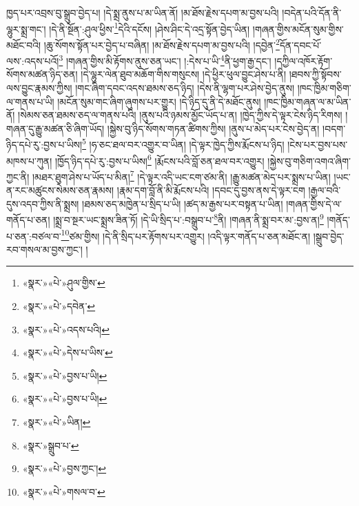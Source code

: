 ཁྱད་པར་འབྲས་བུ་སྒྲུབ་བྱེད་པ། །དེ་སྨྲ་ནུས་པ་མ་ཡིན་ནོ། །མ་ཐོས་རྗེས་དཔག་མ་བྱས་པའི། །བདེན་པའི་དོན་ནི་ལྷུར་སྨྲ་གང་། །དེ་ནི་སྔོན་:ཤུལ་ཕྱིས་\footnote{«སྣར་»«པེ་»ཤུལ་གྱིས་}དེའི་དངོས། །ཤེས་ཤིང་དེ་འདྲ་སྟོན་བྱེད་ཡིན། །གཞན་གྱིས་མངོན་སུམ་གྱིས་མཐོང་བའི། །ཆུ་སོགས་སྟོན་པར་བྱེད་པ་བཞིན། །མ་ཐོས་རྗེས་དཔག་མ་བྱས་པའི། །དབྱེན་\footnote{«སྣར་»«པེ་»དབེན་}དོན་དབང་པོ་ལས་:འདས་པའོ།\footnote{«སྣར་»«པེ་»འདས་པའི།} །གཞན་གྱིས་མི་རྟོགས་ནུས་ཅན་ཡང་། །:དེས་པ་ཡི་\footnote{«སྣར་»«པེ་»དེས་པ་ཡིས་}ནི་ཕྱག་རྒྱ་དང་། །དཀྱིལ་འཁོར་རྟོག་སོགས་མཚན་ཉིད་ཅན། །དེ་ལྷུར་ལེན་ཐུབ་མཆོག་གིས་གསུངས། །དེ་ཕྱིར་ཕུལ་བྱུང་ཤེས་པ་ནི། །ཐབས་ཀྱི་སྟོབས་ལས་བྱུང་རྣམས་ཀྱིས། །གང་ཞིག་དབང་འདས་ཐམས་ཅད་ཉིད། །དེས་ནི་ལྷག་པར་ཤེས་བྱེད་ནུས། །ཁང་ཁྱིམ་གཅིག་ལ་གནས་པ་ཡི། །མངོན་སུམ་གང་ཞིག་ཞུགས་པར་གྱུར། །དེ་ཉིད་དུ་ནི་དེ་མཐོང་ནུས། །ཁང་ཁྱིམ་གཞན་ལ་མ་ཡིན་ནོ། །སེམས་ཅན་ཐམས་ཅད་ལ་གནས་པའི། །ནུས་པའི་ཉམས་མྱོང་ཡོད་པ་ན། །ཁྱེད་ཀྱིས་དེ་ལྟར་ངེས་ཉིད་རིགས། །གཞན་དུ་རྒྱུ་མཚན་ཅི་ཞིག་ཡོད། །སྐྱེས་བུ་ཉིད་སོགས་གཏན་ཚིགས་ཀྱིས། །ནུས་པ་མེད་པར་ངེས་བྱེད་ན། །བདག་ཉིད་དཔེ་རུ་:བྱས་པ་ཡིས།\footnote{«སྣར་»«པེ་»བྱས་པ་ཡི།} །ཧ་ཅང་ཐལ་བར་འགྱུར་བ་ཡིན། །དེ་ལྟར་ཁྱེད་ཀྱིས་རྨོངས་པ་ཉིད། །ངེས་པར་བྱས་པས་མཁས་པ་ཀུན། །ཁྱོད་ཉིད་དཔེ་རུ་:བྱས་པ་ཡིས།\footnote{«སྣར་»«པེ་»བྱས་པ་ཡི།} །རྨོངས་པའི་བློ་ཅན་ཐལ་བར་འགྱུར། །སྐྱེས་བུ་གཅིག་འགའ་ཞིག་ཀྱང་ནི། །མཐར་ཐུག་ཤེས་པ་ཡོད་པ་མིན།\footnote{«སྣར་»«པེ་»ཡིན།} །དེ་ལྟར་འདི་ཡང་ངག་ཙམ་ནི། །རྒྱུ་མཚན་མེད་པར་སྨྲས་པ་ཡིན། །ཡང་ན་རང་མཚུངས་སེམས་ཅན་རྣམས། །རྣམ་དག་བློ་ནི་མི་རྨོངས་པའི། །དབང་དུ་བྱས་ནས་དེ་ལྟར་ངག །རྒྱལ་བའི་དུས་འདབ་ཀྱིས་ནི་སྨྲས། །ཐམས་ཅད་མཁྱེན་པ་སྲིད་པ་ཡི། །ཚད་མ་རྒྱས་པར་བསྟན་པ་ཡིན། །གཞན་གྱིས་དེ་ལ་གནོད་པ་ཅན། །སྨྲ་བ་སྔར་ཡང་སྨྲས་ཟིན་ཏོ། །དེ་ཡི་སྲིད་པ་:བསྒྲུབ་པ་\footnote{«སྣར་»སྒྲུབ་པ་}ནི། །གཞན་ནི་སྨྲ་བར་མ་:བྱས་ན།\footnote{«སྣར་»«པེ་»བྱས་ཀྱང་།} །གནོད་པ་ཅན་:བཙལ་བ་\footnote{«སྣར་»«པེ་»གསལ་བ་}ཙམ་གྱིས། །དེ་ནི་སྲིད་པར་རྟོགས་པར་འགྱུར། །འདི་ལྟར་གནོད་པ་ཅན་མཐོང་ན། །སྒྲུབ་བྱེད་རབ་གསལ་མ་བྱས་ཀྱང་། །
